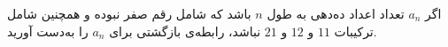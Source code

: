 \EXERCISE
اگر
$a_n$
تعداد اعداد ده‌دهی به طول
$n$
باشد که شامل رقم صفر نبوده و همچنین شامل ترکیبات
$11$
و
$12$
و
$21$
نباشد، رابطه‌ی بازگشتی برای
$a_n$
را به‌دست آورید.